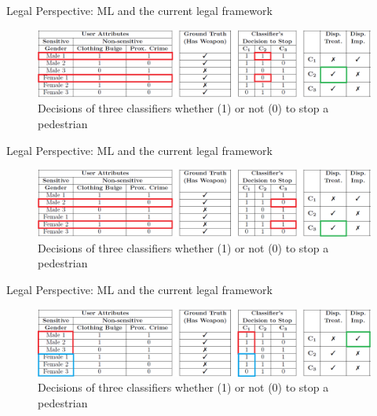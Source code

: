 \begin{frame}{Legal Perspective: ML and the current legal framework \cite{isabel01}}
\begin{figure}
    \vspace{1cm}
    \centering
    \includegraphics[width=\textwidth]{presentation/assets/DisparateTreatImp(1).png}
    \caption{Decisions of three classifiers whether (1) or not (0) to stop a pedestrian \cite{isabel01, isabel02}}
    \label{fig:exampleDisp1}
\end{figure}
\end{frame}

\begin{frame}{Legal Perspective: ML and the current legal framework \cite{isabel01}}
\begin{figure}
    \vspace{1cm}
    \centering
    \includegraphics[width=\textwidth]{presentation/assets/DisparateTreatImp(2).png}
    \caption{Decisions of three classifiers whether (1) or not (0) to stop a pedestrian \cite{isabel01, isabel02}}
    \label{fig:exampleDisp2}
\end{figure}
\end{frame}

\begin{frame}{Legal Perspective: ML and the current legal framework \cite{isabel01}}
\begin{figure}
    \vspace{1cm}
    \centering
    \includegraphics[width=\textwidth]{presentation/assets/DisparateTreatImp(3).png}
    \caption{Decisions of three classifiers whether (1) or not (0) to stop a pedestrian \cite{isabel01, isabel02}}
    \label{fig:exampleDisp3}
\end{figure}
\end{frame}

